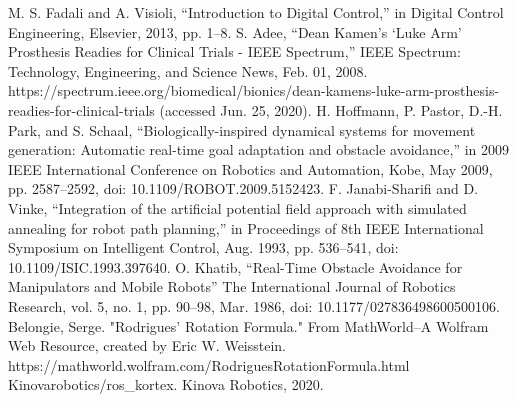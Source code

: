 \documentclass[a4paper, 10pt, conference]{ieeeconf}      %
\begin{document}
\begin{thebibliography}{99}

 M. S. Fadali and A. Visioli, “Introduction to Digital Control,” in Digital Control Engineering, Elsevier, 2013, pp. 1–8.
 S. Adee, “Dean Kamen’s ‘Luke Arm’ Prosthesis Readies for Clinical Trials - IEEE Spectrum,” IEEE Spectrum: Technology, Engineering, and Science News, Feb. 01, 2008. https://spectrum.ieee.org/biomedical/bionics/dean-kamens-luke-arm-prosthesis-readies-for-clinical-trials (accessed Jun. 25, 2020).
 H. Hoffmann, P. Pastor, D.-H. Park, and S. Schaal, “Biologically-inspired dynamical systems for movement generation: Automatic real-time goal adaptation and obstacle avoidance,” in 2009 IEEE International Conference on Robotics and Automation, Kobe, May 2009, pp. 2587–2592, doi: 10.1109/ROBOT.2009.5152423.
 F. Janabi-Sharifi and D. Vinke, “Integration of the artificial potential field approach with simulated annealing for robot path planning,” in Proceedings of 8th IEEE International Symposium on Intelligent Control, Aug. 1993, pp. 536–541, doi: 10.1109/ISIC.1993.397640.
 O. Khatib, “Real-Time Obstacle Avoidance for Manipulators and Mobile Robots” The International Journal of Robotics Research, vol. 5, no. 1, pp. 90–98, Mar. 1986, doi: 10.1177/027836498600500106.
  Belongie, Serge. "Rodrigues' Rotation Formula." From MathWorld--A Wolfram Web Resource, created by Eric W. Weisstein. https://mathworld.wolfram.com/RodriguesRotationFormula.html 
 Kinovarobotics/ros\_kortex. Kinova Robotics, 2020.




\end{thebibliography}
\end{document}
